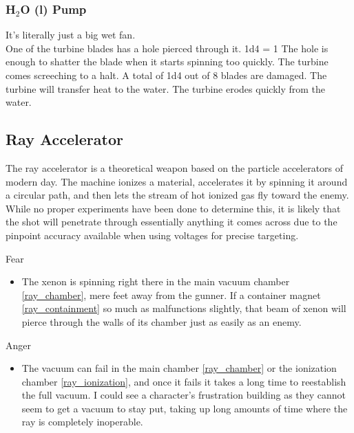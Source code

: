 \documentclass[a4paper]{article}
\begin{document}
\vspace{-0.5cm} \hspace{-18pt} \subsubsection{H$_2$O (l) Pump} \label{railgun_h2o_l_pump} \vspace{-0.2cm}
It's literally just a big wet fan.
\\ \pbhw
{One of the turbine blades has a hole pierced through it. \newline 1d4 = 1 The hole is enough to shatter the blade when it starts spinning too quickly. }
{The turbine comes screeching to a halt. A total of 1d4 out of 8 blades are damaged.}
{The turbine will transfer heat to the water.} 
{The turbine erodes quickly from the water.}


\subsection{Ray Accelerator} \label{ray}

The ray accelerator is a theoretical weapon based on the particle accelerators of modern day. The machine ionizes a material, accelerates it by spinning it around a circular path, and then lets the stream of hot ionized gas fly toward the enemy. While no proper experiments have been done to determine this, it is likely that the shot will penetrate through essentially anything it comes across due to the pinpoint accuracy available when using voltages for precise targeting.

\vspace{0.3cm}
\begin{minipage}[t]{0.4\linewidth}
Fear
\begin{itemize}
\item The xenon is spinning right there in the main vacuum chamber \ref{ray_chamber}, mere feet away from the gunner. If a container magnet \ref{ray_containment} so much as malfunctions slightly, that beam of xenon will pierce through the walls of its chamber just as easily as an enemy. 
\end{itemize}
\end{minipage} 
\begin{minipage}[t]{0.4\linewidth}
Anger
\begin{itemize}
\item The vacuum can fail in the main chamber \ref{ray_chamber} or the ionization chamber \ref{ray_ionization}, and once it fails it takes a long time to reestablish the full vacuum. I could see a character's frustration building as they cannot seem to get a vacuum to stay put, taking up long amounts of time where the ray is completely inoperable.
\end{itemize}
\end{minipage}
\end{document}
